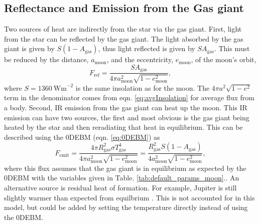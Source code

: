 \documentclass[12pt, onecolumn]{revtex4-2}    %
\newcommand{\flux}{\ensuremath{\ \text{Wm}^{-2}}}
\begin{document}
\subsection{Reflectance and Emission from the Gas giant} \label{ssec:ref_emiss_gg}
%
Two sources of heat are indirectly from the star via the gas giant.
First, light from the star can be reflected by the gas giant.
The light absorbed by the gas giant is given by $S(1-A_\text{gas})$, thus light reflected is given by $SA_\text{gas}$.
This must be reduced by the distance, $a_\text{moon}$, and the eccentricity, $e_\text{moon}$, of the moon's orbit,
\begin{equation}
  F_\text{ref} = \frac{SA_\text{gas}}{4\pi a_\text{moon}^2 \sqrt{1-e_\text{moon}^2}},
  \label{eq:reflectance_flux}
\end{equation}
where $S = 1360 \flux$ is the same insolation as for the moon.
The $4\pi a^2\sqrt{1-e^2}$ term in the denominator comes from eqn. \eqref{eq:avgInsolation} for average flux from a body. 
Second, IR emission from the gas giant can heat up the moon.
This IR emission can have two sources, the first and most obvious is the gas giant being heated by the star and then reradiating that heat in equilibrium.
This can be described using the 0DEBM (eqn. \eqref{eq:0DEBM}) as 
\begin{equation}
    F_\text{emit} = \frac{4 \pi R_\text{gas}^2 \sigma T_\text{gas}^4}{4\pi a_\text{moon}^2 \sqrt{1-e_\text{moon}^2}}
    = \frac{R_\text{gas}^2 S(1 - A_\text{gas})}{4 a_\text{moon}^2 \sqrt{1-e_\text{moon}^2}},
    \label{eq:emission_flux}
\end{equation}
where this flux assumes that the gas giant is in equilibrium as expected by the 0DEBM with the variables given in Table. \ref{tab:default_params_moon}..
An alternative source is residual heat of formation.
For example, Jupiter is still slightly warmer than expected from equilbrium \cite{LJW2018}.
This is not accounted for in this model, but could be added by setting the temperature directly instead of using the 0DEBM.
\end{document}
